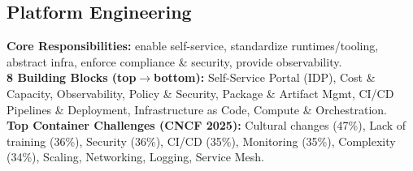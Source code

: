 \subsection{Platform Engineering}
\textbf{Core Responsibilities:} enable self-service, standardize runtimes/tooling, abstract infra, enforce compliance \& security, provide observability. \\
\textbf{8 Building Blocks (top$\to$bottom):} Self-Service Portal (IDP), Cost \& Capacity, Observability, Policy \& Security, Package \& Artifact Mgmt, CI/CD Pipelines \& Deployment, Infrastructure as Code, Compute \& Orchestration. \\
\textbf{Top Container Challenges (CNCF 2025):} Cultural changes (47\%), Lack of training (36\%), Security (36\%), CI/CD (35\%), Monitoring (35\%), Complexity (34\%), Scaling, Networking, Logging, Service Mesh.